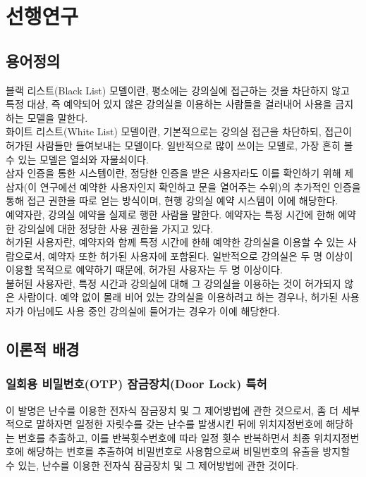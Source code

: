 \documentclass[11pt,a4paper]{article}
\begin{document}
\section{선행연구}

\subsection{용어정의}
블랙 리스트(Black List) 모델이란, 평소에는 강의실에 접근하는 것을 차단하지 않고 특정 대상, 즉 예약되어 있지 않은 강의실을 이용하는 사람들을 걸러내어 사용을 금지하는 모델을 말한다.\\
화이트 리스트(White List) 모델이란, 기본적으로는 강의실 접근을 차단하되, 접근이 허가된 사람들만 들여보내는 모델이다. 일반적으로 많이 쓰이는 모델로, 가장 흔히 볼 수 있는 모델은 열쇠와 자물쇠이다.\\
삼자 인증을 통한 시스템이란, 정당한 인증을 받은 사용자라도 이를 확인하기 위해 제삼자(이 연구에선 예약한 사용자인지 확인하고 문을 열어주는 수위)의 추가적인 인증을 통해 접근 권한을 따로 얻는 방식이며, 현행 강의실 예약 시스템이 이에 해당한다.\\
예약자란, 강의실 예약을 실제로 행한 사람을 말한다. 예약자는 특정 시간에 한해 예약한 강의실에 대한 정당한 사용 권한을 가지고 있다.\\
허가된 사용자란, 예약자와 함께 특정 시간에 한해 예약한 강의실을 이용할 수 있는 사람으로서, 예약자 또한 허가된 사용자에 포함된다. 일반적으로 강의실은 두 명 이상이 이용할 목적으로 예약하기 때문에, 허가된 사용자는 두 명 이상이다.\\
불허된 사용자란, 특정 시간과 강의실에 대해 그 강의실을 이용하는 것이 허가되지 않은 사람이다. 예약 없이 몰래 비어 있는 강의실을 이용하려고 하는 경우나, 허가된 사용자가 아님에도 사용 중인 강의실에 들어가는 경우가 이에 해당한다.

\subsection{이론적 배경}

\subsubsection{일회용 비밀번호(OTP) 잠금장치(Door Lock) 특허}
이 발명은 난수를 이용한 전자식 잠금장치 및 그 제어방법에 관한 것으로서, 좀 더 세부적으로 말하자면 일정한 자릿수를 갖는 난수를 발생시킨 뒤에 위치지정번호에 해당하는 번호를 추출하고, 이를 반복횟수번호에 따라 일정 횟수 반복하면서 최종 위치지정번호에 해당하는 번호를 추출하여 비밀번호로 사용함으로써 비밀번호의 유출을 방지할 수 있는, 난수를 이용한 전자식 잠금장치 및 그 제어방법에 관한 것이다.
\end{document}
